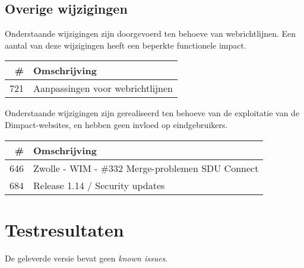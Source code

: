 \documentclass[12pt]{article}
\begin{document}
\subsection{Overige wijzigingen}

Onderstaande wijzigingen zijn doorgevoerd ten behoeve van webrichtlijnen. Een aantal van deze wijzigingen heeft een beperkte functionele impact.

\begin{tabular}{| r | p{15cm} |}
	\hline \# & Omschrijving \\ \hline \hline
	721 & Aanpassingen voor webrichtlijnen \\ \hline
\end{tabular}

Onderstaande wijzigingen zijn gerealiseerd ten behoeve van de exploitatie van de Dimpact-websites, en hebben geen invloed op eindgebruikers.

\begin{tabular}{| r | p{15cm} |}
	\hline \# & Omschrijving \\ \hline \hline
	646 & Zwolle - WIM - \#332 Merge-problemen SDU Connect \\ \hline
	684 & Release 1.14 / Security updates \\ \hline
\end{tabular}

\section{Testresultaten}
De geleverde versie bevat geen \emph{known issues}.
\end{document}
